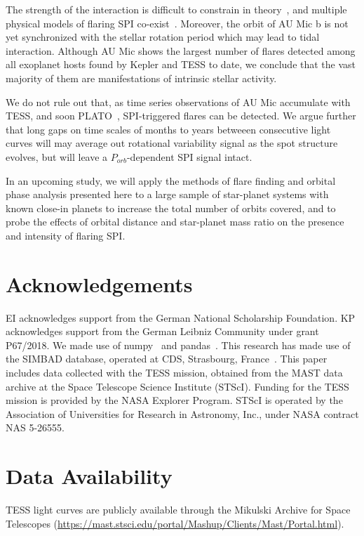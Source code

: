 \documentclass[fleqn,usenatbib,letters]{mnras}%
\begin{document}
The strength of the interaction is difficult to constrain in theory~\citep{strugarek2019}, and multiple physical models of flaring SPI co-exist~\citep{lanza2018close-by, saur2013}. Moreover, the orbit of AU Mic b is not yet synchronized with the stellar rotation period which may lead to tidal interaction. Although AU Mic shows the largest number of flares detected among all exoplanet hosts found by Kepler and TESS to date, we conclude that the vast majority of them are manifestations of intrinsic stellar activity. 

We do not rule out that, as time series observations of AU Mic accumulate with TESS, and soon PLATO~\citep{rauer2014plato}, SPI-triggered flares can be detected. We argue further that long gaps on time scales of months to years betweeen consecutive light curves will may average out rotational variability signal as the spot structure evolves, but will leave a $P_{orb}$-dependent SPI signal intact. 

In an upcoming study, we will apply the methods of flare finding and orbital phase analysis presented here to a large sample of star-planet systems with known close-in planets to increase the total number of orbits covered, and to probe the effects of orbital distance and star-planet mass ratio on the presence and intensity of flaring SPI.
\section*{Acknowledgements}
EI acknowledges support from the German National Scholarship Foundation. KP acknowledges support from the German Leibniz Community under grant P67/2018. We made use of numpy~\citep{numpy2020} and pandas~\citep{pandas2010,pandas2020software}. This research has made use of the SIMBAD database, operated at CDS, Strasbourg, France~\citep{wenger2000}. This paper includes data collected with the TESS mission, obtained from the MAST data archive at the Space Telescope Science Institute (STScI). Funding for the TESS mission is provided by the NASA Explorer Program. STScI is operated by the Association of Universities for Research in Astronomy, Inc., under NASA contract NAS 5-26555.

\section*{Data Availability}
TESS light curves are publicly available through the Mikulski Archive for Space Telescopes (\url{https://mast.stsci.edu/portal/Mashup/Clients/Mast/Portal.html}).
\end{document}
